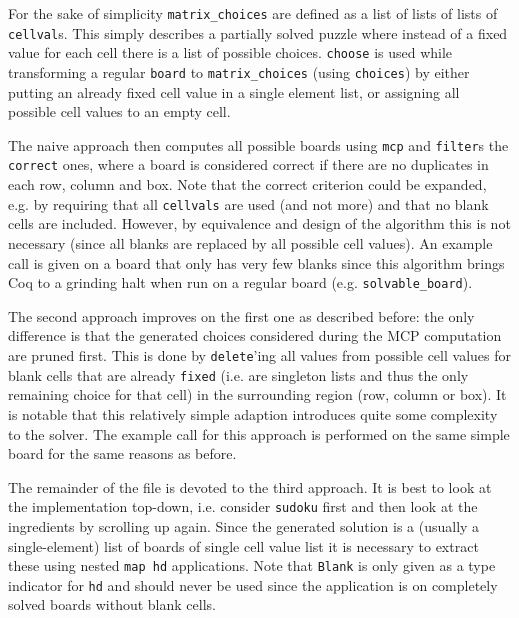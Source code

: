 \documentclass[a4paper,11pt]{article}
\begin{document}
For the sake of simplicity \texttt{matrix\_choices} are defined as a list of lists of lists of \texttt{cellval}s. This simply describes a partially solved puzzle where instead of a fixed value for each cell there is a list of possible choices. \texttt{choose} is used while transforming a regular \texttt{board} to \texttt{matrix\_choices} (using \texttt{choices}) by either putting an already fixed cell value in a single element list, or assigning all possible cell values to an empty cell.

The naive approach then computes all possible boards using \texttt{mcp} and \texttt{filter}s the \texttt{correct} ones, where a board is considered correct if there are no duplicates in each row, column and box. Note that the correct criterion could be expanded, e.g. by requiring that all \texttt{cellvals} are used (and not more) and that no blank cells are included. However, by equivalence and design of the algorithm this is not necessary (since all blanks are replaced by all possible cell values). An example call is given on a board that only has very few blanks since this algorithm brings Coq to a grinding halt when run on a regular board (e.g. \texttt{solvable\_board}).

The second approach improves on the first one as described before: the only difference is that the generated choices considered during the MCP computation are pruned first. This is done by \texttt{delete}'ing all values from possible cell values for blank cells that are already \texttt{fixed} (i.e. are singleton lists and thus the only remaining choice for that cell) in the surrounding region (row, column or box). It is notable that this relatively simple adaption introduces quite some complexity to the solver. The example call for this approach is performed on the same simple board for the same reasons as before.

The remainder of the file is devoted to the third approach. It is best to look at the implementation top-down, i.e. consider \texttt{sudoku} first and then look at the ingredients by scrolling up again. Since the generated solution is a (usually a single-element) list of boards of single cell value list it is necessary to extract these using nested \texttt{map hd} applications. Note that \texttt{Blank} is only given as a type indicator for \texttt{hd} and should never be used since the application is on completely solved boards without blank cells.
\end{document}
